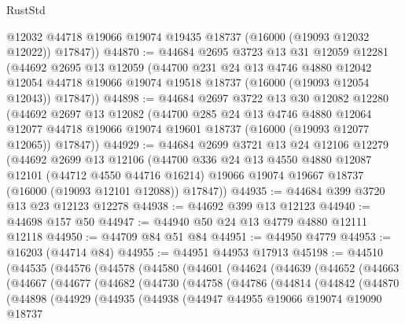 \begin{lexlean}{RustStd}
\begin{coremodule}
        @12032
        @44718
        @19066
        @19074
        @19435
        @18737
        (@16000 (@19093 @12032 @12022))
        @17847))
@44870 := @44684
    @2695
    @3723
    @13
    @31
    @12059
    @12281
    (@44692
      @2695
      @13
      @12059
      (@44700
        @231
        @24
        @13
        @4746
        @4880
        @12042
        @12054
        @44718
        @19066
        @19074
        @19518
        @18737
        (@16000 (@19093 @12054 @12043))
        @17847))
@44898 := @44684
    @2697
    @3722
    @13
    @30
    @12082
    @12280
    (@44692
      @2697
      @13
      @12082
      (@44700
        @285
        @24
        @13
        @4746
        @4880
        @12064
        @12077
        @44718
        @19066
        @19074
        @19601
        @18737
        (@16000 (@19093 @12077 @12065))
        @17847))
@44929 := @44684
    @2699
    @3721
    @13
    @24
    @12106
    @12279
    (@44692
      @2699
      @13
      @12106
      (@44700
        @336
        @24
        @13
        @4550
        @4880
        @12087
        @12101
        (@44712 @4550 @44716 @16214)
        @19066
        @19074
        @19667
        @18737
        (@16000 (@19093 @12101 @12088))
        @17847))
@44935 := @44684 @399 @3720 @13 @23 @12123 @12278
@44938 := @44692 @399 @13 @12123
@44940 := @44698 @157 @50
@44947 := @44940 @50 @24 @13 @4779 @4880 @12111 @12118
@44950 := @44709 @84 @51 @84
@44951 := @44950 @4779
@44953 := @16203 (@44714 @84)
@44955 := @44951 @44953 @17913
@45198 := @44510
    (@44535
      (@44576
        (@44578
          (@44580
            (@44601
              (@44624
                (@44639
                  (@44652
                    (@44663
                      (@44667
                        (@44677
                          (@44682
                            (@44730
                              (@44758
                                (@44786
                                  (@44814
                                    (@44842
                                      (@44870
                                        (@44898
                                          (@44929
                                            (@44935
                                              (@44938
                                                (@44947
                                                  @44955
                                                  @19066
                                                  @19074
                                                  @19090
                                                  @18737

\end{coremodule}
\end{lexlean}
